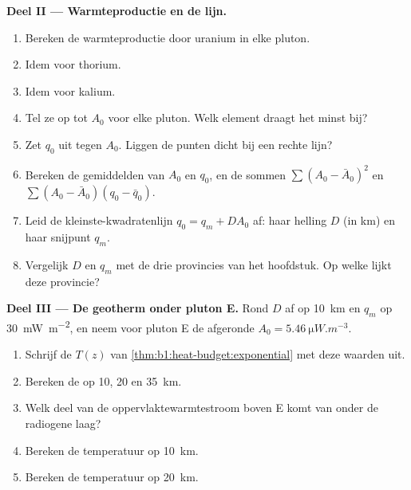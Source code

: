 \begin{problem}
\noindent\textbf{Deel II --- Warmteproductie en de lijn.}
\begin{enumerate}[resume]
  \item Bereken de warmteproductie door uranium in elke pluton.
  \item Idem voor thorium.
  \item Idem voor kalium.
  \item Tel ze op tot $A_0$ voor elke pluton. Welk element draagt het minst bij?
  \item Zet $q_0$ uit tegen $A_0$. Liggen de punten dicht bij een rechte lijn?
  \item Bereken de gemiddelden van $A_0$ en $q_0$, en de sommen
        $\sum (A_0 - \bar A_0)^2$ en $\sum (A_0 - \bar A_0)(q_0 - \bar q_0)$.
  \item Leid de kleinste-kwadratenlijn $q_0 = q_m + D A_0$ af: haar helling $D$ (in
        \unit{km}) en haar snijpunt $q_m$.
  \item Vergelijk $D$ en $q_m$ met de drie provincies van het hoofdstuk. Op welke lijkt deze provincie?
\end{enumerate}

\noindent\textbf{Deel III --- De geotherm onder pluton E.}
Rond $D$ af op \qty{10}{km} en $q_m$ op \qty{30}{mW.m^{-2}}, en neem voor pluton E de afgeronde $A_0 = \qty{5.46}{\micro W.m^{-3}}$.
\begin{enumerate}[resume]
  \item Schrijf de  $T(z)$ van \cref{thm:b1:heat-budget:exponential} met deze waarden uit.
  \item Bereken de  op 10, 20 en \qty{35}{km}.
  \item Welk deel van de oppervlaktewarmtestroom boven E komt van onder de radiogene laag?
  \item Bereken de temperatuur op \qty{10}{km}.
  \item Bereken de temperatuur op \qty{20}{km}.
\end{enumerate}


\end{problem}
